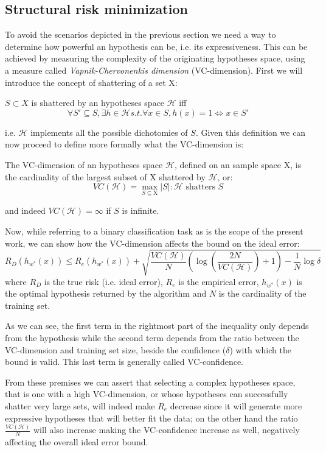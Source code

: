 \subsection{Structural risk minimization}
\label{subsec:srm}
To avoid the scenarios depicted in the previous section we need a way to determine
how powerful an hypothesis can be, i.e. its expressiveness.
This can be achieved by measuring the complexity of the originating hypotheses space,
using a measure called \emph{Vapnik-Chervonenkis dimension} (VC-dimension).
First we will introduce the concept of shattering of a set $\mathrm{X}$:
\begin{definition}[Shattering]
    $S \subset X$ is shattered by an hypotheses space $\mathcal{H}$ iff
    \[\forall S' \subseteq S, \exists h \in \mathcal{H} s.t. \forall x \in S, h(x)=1 \iff x \in S'\]
\end{definition}
i.e. $\mathcal{H}$ implements all the possible dichotomies of $S$.
Given this definition we can now proceed to define more formally what the
VC-dimension is:
\begin{definition}[VC-dimension]
    The VC-dimension of an hypotheses space $\mathcal{H}$, defined on an sample
    space $\mathrm{X}$, is the cardinality of the largest subset of $\mathrm{X}$
    shattered by $\mathcal{H}$, or:
    \[VC(\mathcal{H}) = \max_{S\subseteq \mathrm{X}} |S| : \mathcal{H}\text{ shatters }S\]
\end{definition}
and indeed $VC(\mathcal{H})=\infty$ if $S$ is infinite.

Now, while referring to a binary classification task as is the scope of the present
work, we can show how the VC-dimension affects the bound on the ideal error:
\begin{displaymath}
    R_D(h_{w^*}(x)) \leq R_e(h_{w^*}(x)) + \sqrt{\frac{VC(\mathcal{H})}{N}
    (\log{(\frac{2N}{VC(\mathcal{H})})}+1) - \frac{1}{N}\log{\delta}}
\end{displaymath}
where $R_D$ is the true risk (i.e. ideal error), $R_e$ is the empirical error,
$h_{w^*}(x)$ is the optimal hypothesis returned by the algorithm and $N$ is the
cardinality of the training set.

As we can see, the first term in the rightmost part of the inequality only 
depends from the hypothesis while the second term depends from the ratio
between the VC-dimension and training set size, beside the confidence ($\delta$)
with which the bound is valid.
This last term is generally called VC-confidence.

From these premises we can assert that selecting a complex hypotheses space,
that is one with a high VC-dimension, or whose hypotheses can successfully shatter
very large sets, will indeed make $R_e$ decrease since it will generate more
expressive hypotheses that will better fit the data; on the other hand the ratio
$\frac{VC(\mathcal{H})}{N}$ will also increase making the VC-confidence increase
as well, negatively affecting the overall ideal error bound.

